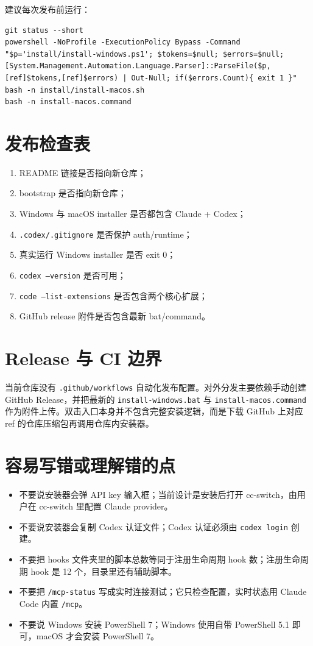 \documentclass[11pt,a4paper]{ctexbook}
\begin{document}
建议每次发布前运行：

\begin{lstlisting}[language={}]
git status --short
powershell -NoProfile -ExecutionPolicy Bypass -Command "$p='install/install-windows.ps1'; $tokens=$null; $errors=$null; [System.Management.Automation.Language.Parser]::ParseFile($p,[ref]$tokens,[ref]$errors) | Out-Null; if($errors.Count){ exit 1 }"
bash -n install/install-macos.sh
bash -n install-macos.command
\end{lstlisting}

\section{发布检查表}

\begin{enumerate}[leftmargin=2em]
  \item README 链接是否指向新仓库；
  \item bootstrap 是否指向新仓库；
  \item Windows 与 macOS installer 是否都包含 Claude + Codex；
  \item \texttt{.codex/.gitignore} 是否保护 auth/runtime；
  \item 真实运行 Windows installer 是否 exit 0；
  \item \texttt{codex --version} 是否可用；
  \item \texttt{code --list-extensions} 是否包含两个核心扩展；
  \item GitHub release 附件是否包含最新 bat/command。
\end{enumerate}

\section{Release 与 CI 边界}

当前仓库没有 \texttt{.github/workflows} 自动化发布配置。对外分发主要依赖手动创建 GitHub Release，并把最新的 \texttt{install-windows.bat} 与 \texttt{install-macos.command} 作为附件上传。双击入口本身并不包含完整安装逻辑，而是下载 GitHub 上对应 ref 的仓库压缩包再调用仓库内安装器。

\section{容易写错或理解错的点}

\begin{itemize}[leftmargin=2em]
  \item 不要说安装器会弹 API key 输入框；当前设计是安装后打开 cc-switch，由用户在 cc-switch 里配置 Claude provider。
  \item 不要说安装器会复制 Codex 认证文件；Codex 认证必须由 \texttt{codex login} 创建。
  \item 不要把 hooks 文件夹里的脚本总数等同于注册生命周期 hook 数；注册生命周期 hook 是 12 个，目录里还有辅助脚本。
  \item 不要把 \texttt{/mcp-status} 写成实时连接测试；它只检查配置，实时状态用 Claude Code 内置 \texttt{/mcp}。
  \item 不要说 Windows 安装 PowerShell 7；Windows 使用自带 PowerShell 5.1 即可，macOS 才会安装 PowerShell 7。
\end{itemize}
\end{document}
